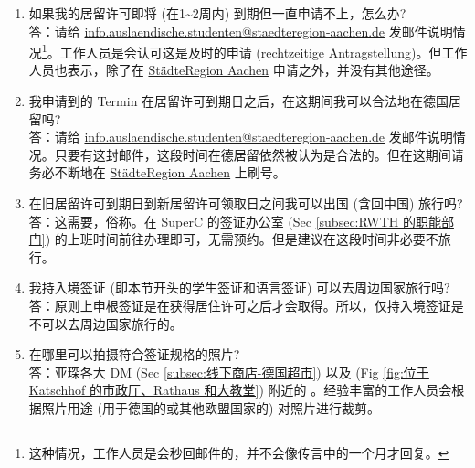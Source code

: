     \begin{enumerate}
      \item 如果我的居留许可即将 (在1\textasciitilde2周内) 到期但一直申请不上，怎么办?\\
      答：请给 \href{mailto:info.auslaendische.studenten@staedteregion-aachen.de}{info.auslaendische.studenten@staedteregion-aachen.de} 发邮件说明情况\footnote{这种情况，工作人员是会秒回邮件的，并不会像传言中的一个月才回复。}。工作人员是会认可这是及时的申请 (rechtzeitige Antragstellung)。但工作人员也表示，除了在 \href{https://termine.staedteregion-aachen.de/auslaenderamt/}{StädteRegion Aachen} 申请之外，并没有其他途径。
      \item 我申请到的 Termin 在居留许可到期日之后，在这期间我可以合法地在德国居留吗?\\
      答：请给 \href{mailto:info.auslaendische.studenten@staedteregion-aachen.de}{info.auslaendische.studenten@staedteregion-aachen.de} 发邮件说明情况。只要有这封邮件，这段时间在德居留依然被认为是合法的。但在这期间请务必不断地在 \href{https://termine.staedteregion-aachen.de/auslaenderamt/}{StädteRegion Aachen} 上刷号。
      \item 在旧居留许可到期日到新居留许可领取日之间我可以出国 (含回中国) 旅行吗?\\
      答：这需要，俗称。在 SuperC 的签证办公室 (Sec \ref{subsec:RWTH 的职能部门}) 的上班时间前往办理即可，无需预约。但是建议在这段时间非必要不旅行。
      \item 我持入境签证 (即本节开头的学生签证和语言签证) 可以去周边国家旅行吗?\\
      答：原则上申根签证是在获得居住许可之后才会取得。所以，仅持入境签证是不可以去周边国家旅行的。
      \item 在哪里可以拍摄符合签证规格的照片?\\
      答：亚琛各大 DM (Sec \ref{subsec:线下商店-德国超市}) 以及 (Fig \ref{fig:位于 Katschhof 的市政厅、Rathaus 和大教堂}) 附近的 。经验丰富的工作人员会根据照片用途 (用于德国的或其他欧盟国家的) 对照片进行裁剪。
    \end{enumerate}
